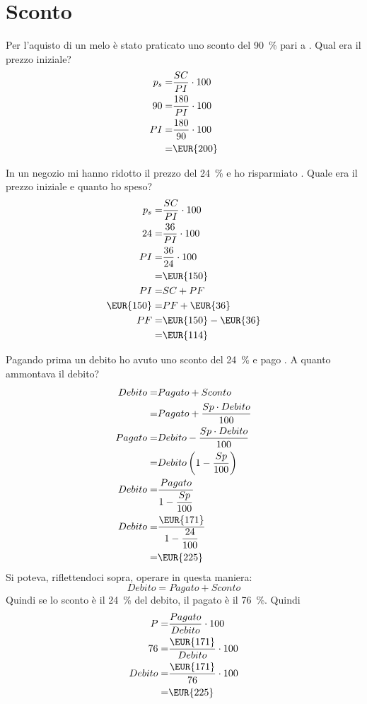 \section{Sconto}
\begin{exercise}
	Per l'aquisto di un melo è stato praticato uno sconto del  \SI{90}{\percent} pari a  . Qual era il prezzo iniziale?
	\tcblower
	\begin{align*}
		p_s=&\dfrac{SC}{PI}\cdot 100\\
		90=&\dfrac{180}{PI}\cdot 100\\
		PI=&\dfrac{180}{90}\cdot 100\\
		=&\mbox{\EUR{200}}
	\end{align*}
\end{exercise}
\begin{exercise}
In un negozio mi hanno ridotto il prezzo del  \SI{24}{\percent} e ho risparmiato . Quale era il prezzo iniziale e quanto ho speso?
	\tcblower
	\begin{align*}
		p_s=&\dfrac{SC}{PI}\cdot 100\\
		24=&\dfrac{36}{PI}\cdot 100\\
		PI=&\dfrac{36}{24}\cdot 100\\
		=&\mbox{\EUR{150}}\\
		PI=&SC+PF\\
		\mbox{\EUR{150}}=&PF+\mbox{\EUR{36}}\\
		PF=&\mbox{\EUR{150}}-\mbox{\EUR{36}}\\
		=&\mbox{\EUR{114}}\\
	\end{align*}
\end{exercise}
\begin{exercise}
	Pagando prima un debito ho avuto uno sconto del  \SI{24}{\percent} e pago . A quanto ammontava il debito?
	\tcblower
	\begin{align*}
	Debito=&Pagato+Sconto\\
	=&Pagato+\dfrac{Sp\cdot Debito}{100}\\
	Pagato=&Debito-\dfrac{Sp\cdot Debito}{100}\\
	=&Debito\left(1-\dfrac{Sp}{100}\right)\\
	Debito=&\dfrac{Pagato}{1-\dfrac{Sp}{100}}\\
	Debito=&\dfrac{\mbox{\EUR{171}}}{1-\dfrac{24}{100}}\\
	=&\mbox{\EUR{225}}
	\end{align*}
Si poteva, riflettendoci sopra, operare in questa maniera:
\[Debito=Pagato+Sconto\]
Quindi se lo sconto è il \SI{24}{\percent} del debito, il pagato è il \SI{76}{\percent}. Quindi
\begin{align*}
	P=&\dfrac{Pagato}{Debito}\cdot100\\
	76=&\dfrac{\mbox{\EUR{171}}}{Debito}\cdot 100\\
	Debito=&\dfrac{\mbox{\EUR{171}}}{76}\cdot 100\\
	=&\mbox{\EUR{225}}
\end{align*} 
\end{exercise}
